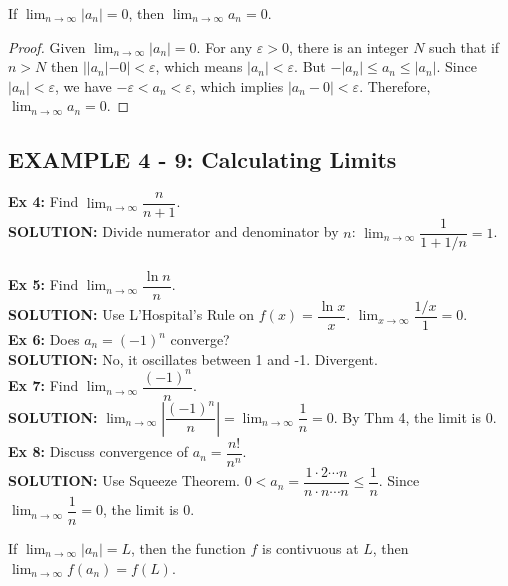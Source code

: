 \documentclass{article}
\theoremstyle{mystyle}
\begin{document}
\begin{tcolorbox}[colback=white, colframe=orange!80!white, title=Theorem 4, boxrule=0.5mm, arc=3mm]
If \( \lim_{n\to\infty} |a_n| = 0 \), then \( \lim_{n\to\infty} a_n = 0 \).
\end{tcolorbox}
\begin{proof}
Given \( \lim_{n\to\infty} |a_n| = 0 \). For any \(\varepsilon > 0\), there is an integer \(N\) such that if \(n>N\) then \(||a_n|-0| < \varepsilon\), which means \(|a_n| < \varepsilon\). But \( -|a_n| \le a_n \le |a_n| \). Since \(|a_n|<\varepsilon\), we have \(-\varepsilon < a_n < \varepsilon\), which implies \(|a_n - 0| < \varepsilon\). Therefore, \( \lim_{n\to\infty} a_n = 0 \).
\end{proof}

\subsection*{EXAMPLE 4 - 9: Calculating Limits}
\textbf{Ex 4:} Find \(\lim_{n\to\infty} \dfrac{n}{n+1}\).\\
 \textbf{SOLUTION:} Divide numerator and denominator by \(n\): \(\lim_{n\to\infty} \dfrac{1}{1+1/n} = 1\).\\\\
\textbf{Ex 5:} Find \(\lim_{n\to\infty} \dfrac{\ln n}{n}\).\\
 \textbf{SOLUTION:} Use L'Hospital's Rule on \(f(x) = \dfrac{\ln x}{x}\). \(\lim_{x\to\infty} \dfrac{1/x}{1} = 0\).\\
\textbf{Ex 6:} Does \(a_n = (-1)^n\) converge?\\
 \textbf{SOLUTION:} No, it oscillates between 1 and -1. Divergent.\\
\textbf{Ex 7:} Find \(\lim_{n\to\infty} \dfrac{(-1)^n}{n}\).\\
 \textbf{SOLUTION:} \(\lim_{n\to\infty} |\dfrac{(-1)^n}{n}| = \lim_{n\to\infty} \dfrac{1}{n} = 0\). By Thm 4, the limit is 0.\\
\textbf{Ex 8:} Discuss convergence of \(a_n = \dfrac{n!}{n^n}\).\\
 \textbf{SOLUTION:} Use Squeeze Theorem. \(0 < a_n = \dfrac{1 \cdot 2 \cdots n}{n \cdot n \cdots n} \le \dfrac{1}{n}\). Since \(\lim_{n\to\infty} \dfrac{1}{n} = 0\), the limit is 0.

 \begin{tcolorbox}[colback=white, colframe=orange!80!white, title=Theorem 4, boxrule=0.5mm, arc=3mm]
  If \( \lim_{n\to\infty} |a_n| = L \), then the function \(f\) is contivuous at \(L\), then \( \lim_{n\to\infty} f(a_n) = f(L) \).
\end{tcolorbox}
\end{document}
